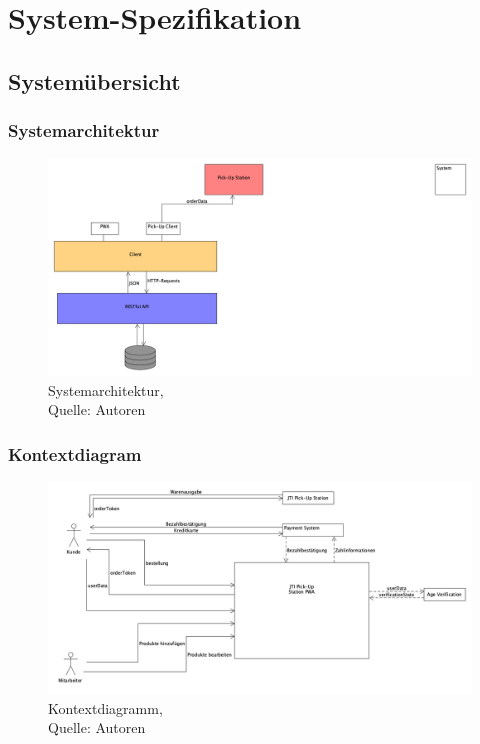 \section{System-Spezifikation}\label{SystemSpezifikation}
\subsection{Systemübersicht}
\subsubsection{Systemarchitektur}
\begin{figure}[H]
    \centering
    \includegraphics[width=1\textwidth]{images/systemoverview.png}
    \caption[Systemarchitektur]{Systemarchitektur,\\ Quelle: Autoren}
    \label{img: Systemarchitektur des Projektes}
\end{figure}
\newpage
\subsubsection{Kontextdiagram}\label{Kontextdiagram}
\begin{figure}[H]
    \centering
   \includegraphics[width=1\textwidth]{images/kontextdiagramm.png}
    \caption[Kontextdiagramm]{Kontextdiagramm,\\ Quelle: Autoren}
    \label{img: Kontextdiagramm des Projektes}
\end{figure}
\newpage


